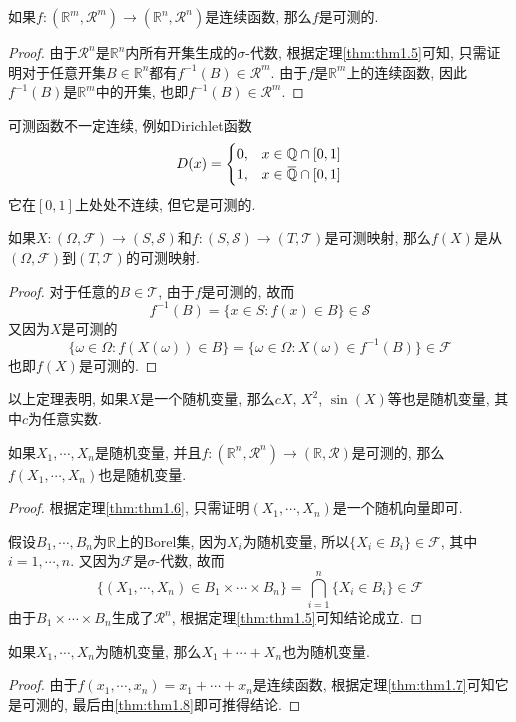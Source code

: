 \documentclass[cn, 12pt, math=mtpro2, bibstyle=apa, blue, twocol]{elegantbook}
\newcommand{\F}{\mathcal{F}}
\newcommand{\R}{\mathbb{R}}
\newcommand{\SE}{\mathcal{S}}
\newcommand{\overbar}[1]{\mkern 1.5mu\overline{\mkern-1.5mu#1\mkern-1.5mu}\mkern 1.5mu}
\begin{document}
\begin{theorem}\label{thm:thm1.7}
  如果$f:(\R^m,\mathcal{R}^m) \to (\R^n,\mathcal{R}^n)$是连续函数, 那么$f$是可测的.
\end{theorem}
\begin{proof}
  由于$\mathcal{R}^n$是$\R^n$内所有开集生成的$\sigma$-代数, 根据定理\ref{thm:thm1.5}可知, 只需证明对于任意开集$B\in\R^n$都有$f^{-1}(B)\in\mathcal{R}^m$. 由于$f$是$\R^m$上的连续函数, 因此$f^{-1}(B)$是$\R^m$中的开集, 也即$f^{-1}(B)\in \mathcal{R}^m$.
\end{proof}
\begin{remark}
可测函数不一定连续, 例如Dirichlet函数
$$D(x)=\begin{cases}
         0, & x\in \mathbb{Q}\cap [0,1] \\
         1, & x\in \overbar{\mathbb{Q}}\cap [0,1]
       \end{cases}$$
它在$[0,1]$上处处不连续, 但它是可测的.
\end{remark}

\begin{theorem}\label{thm:thm1.6}
  如果$X:(\Omega,\F)\to (S,\SE)$和$f:(S,\SE)\to (T,\mathcal{T})$是可测映射, 那么$f(X)$是从$(\Omega,\F)$到$(T,\mathcal{T})$的可测映射.
\end{theorem}
\begin{proof}
  对于任意的$B\in\mathcal{T}$, 由于$f$是可测的, 故而
  $$f^{-1}(B)=\{x\in S: f(x)\in B\}\in\SE$$
  又因为$X$是可测的
  $$\{\omega\in\Omega: f(X(\omega))\in B\}=\{\omega\in\Omega: X(\omega)\in f^{-1}(B)\}\in\F$$
  也即$f(X)$是可测的.
\end{proof}
以上定理表明, 如果$X$是一个随机变量, 那么$cX$, $X^2$, $\sin(X)$等也是随机变量, 其中$c$为任意实数.
\begin{theorem}\label{thm:thm1.8}
  如果$X_1,\cdots,X_n$是随机变量, 并且$f:(\R^n,\mathcal{R}^n)\to (\R,\mathcal{R})$是可测的, 那么$f(X_1,\cdots,X_n)$也是随机变量.
\end{theorem}
\begin{proof}
  根据定理\ref{thm:thm1.6}, 只需证明$(X_1,\cdots,X_n)$是一个随机向量即可.

  假设$B_1,\cdots,B_n$为$\R$上的Borel集, 因为$X_i$为随机变量, 所以$\{X_i\in B_i\}\in\F$, 其中$i=1,\cdots,n$. 又因为$\F$是$\sigma$-代数, 故而
  $$\{(X_1,\cdots,X_n)\in B_1\times\cdots\times B_n\}=\textstyle \bigcap_{i=1}^n \{X_i\in B_i\}\in\F$$
  由于$B_1\times\cdots\times B_n$生成了$\mathcal{R}^n$, 根据定理\ref{thm:thm1.5}可知结论成立.
\end{proof}
\begin{corollary}
如果$X_1,\cdots,X_n$为随机变量, 那么$X_1+\cdots+X_n$也为随机变量.
\end{corollary}
\begin{proof}
  由于$f(x_1,\cdots,x_n)=x_1+\cdots+x_n$是连续函数, 根据定理\ref{thm:thm1.7}可知它是可测的, 最后由\ref{thm:thm1.8}即可推得结论.
\end{proof}
\end{document}
